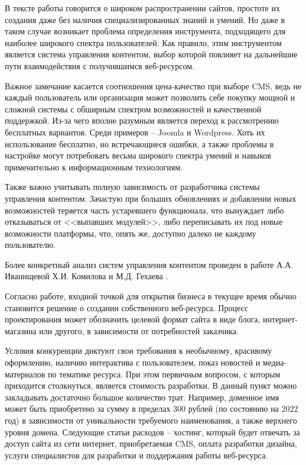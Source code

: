 В тексте работы говорится о широком распространении сайтов, простоте их создания даже без наличия специализированных знаний и умений.
Но даже в таком случае возникает проблема определения инструмента, подходящего для наиболее широкого спектра пользователей.
Как правило, этим инструментом является система управления контентом, выбор которой повлияет на дальнейшие пути взаимодействия с получившимся веб-ресурсом.

Важное замечание касается соотношения цена-качество при выборе CMS, ведь не каждый пользователь или организация может позволить себе покупку мощной и сложной системы с обширным спектром возможностей и качественной поддержкой.
Из-за чего вполне разумным является переход к рассмотрению бесплатных вариантов.
Среди примеров -- Joomla и Wordpress.
Хоть их использование бесплатно, но встречающиеся ошибки, а также проблемы в настройке могут потребовать весьма широкого спектра умений и навыков применительно к информационным технологиям.

Также важно учитывать полную зависимость от разработчика системы управления контентом.
Зачастую при больших обновлениях и добавлении новых возможностей теряется часть устаревшего функционала, что вынуждает либо отказываться от <<выпавших модулей>>, либо переписывать их под новые возможности платформы, что, опять же, доступно далеко не каждому пользователю.

Более конкретный анализ систем управления контентом проведен в работе А.А. Иванищевой Х.И. Комилова и М.Д. Гехаева \cite{ivanisheva-cms}.

Согласно работе, входной точкой для открытия бизнеса в текущее время обычно становится решение о создании собственного веб-ресурса.
Процесс проектирования может обозначить целевой формат сайта в виде блога, интернет-магазина или другого, в зависимости от потребностей заказчика.

Условия конкуренции диктуют свои требования к необычному, красивому оформлению, наличию интерактива с пользователем, показ новостей и медиа-материалов по тематике ресурса.
При этом первичным вопросом, с которым приходится столкнуться, является стоимость разработки.
В данный пункт можно закладывать достаточно большое количество трат.
Например, доменное имя может быть приобретено за сумму в пределах 300 рублей (по состоянию на 2022 год) в зависимости от уникальности требуемого наименования, а также верхнего уровня домена.
Следующие статьи расходов -- хостинг, который будет отвечать за доступ сайта из сети интернет, приобретаемая CMS, оплата разработки дизайна, услуги специалистов для разработки и поддержания работы веб-ресурса.


